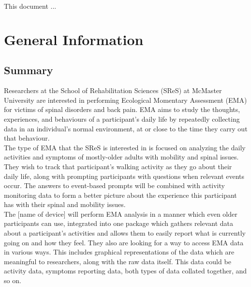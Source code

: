 \documentclass[12pt, titlepage]{article}
\begin{document}


\newpage


This document ... 

\section{General Information}

\subsection{Summary}

Researchers at the School of Rehabilitation Sciences (SReS) at McMaster University are interested in performing Ecological Momentary Assessment (EMA) for victims of spinal disorders and back pain. EMA aims to study the thoughts, experiences, and behaviours of a participant's daily life by repeatedly collecting data in an individual's normal environment, at or close to the time they carry out that behaviour.\\

The type of EMA that the SReS is interested in is focused on analyzing the daily activities and symptoms of mostly-older adults with mobility and spinal issues. They wish to track that participant's walking activity as they go about their daily life, along with prompting participants with questions when relevant events occur. The answers to event-based prompts will be combined with activity monitoring data to form a better picture about the experience this participant has with their spinal and mobility issues.\\

The [name of device] will perform EMA analysis in a manner which even older participants can use, integrated into one package which gathers relevant data about a participant's activities and allows them to easily report what is currently going on and how they feel. They also are looking for a way to access EMA data in various ways. This includes graphical representations of the data which are meaningful to researchers, along with the raw data itself. This data could be activity data, symptoms reporting data, both types of data collated together, and so on. \\
\end{document}
